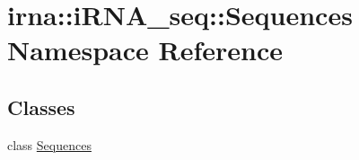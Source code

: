 \hypertarget{namespaceirna_1_1iRNA__seq_1_1Sequences}{
\section{irna\-:\-:i\-R\-N\-A\-\_\-seq\-:\-:\-Sequences \-Namespace \-Reference}
\label{namespaceirna_1_1iRNA__seq_1_1Sequences}
}
\subsection*{\-Classes}
\begin{DoxyCompactItemize}
\item 
class \hyperlink{classirna_1_1iRNA__seq_1_1Sequences_1_1Sequences}{\-Sequences}
\end{DoxyCompactItemize}
